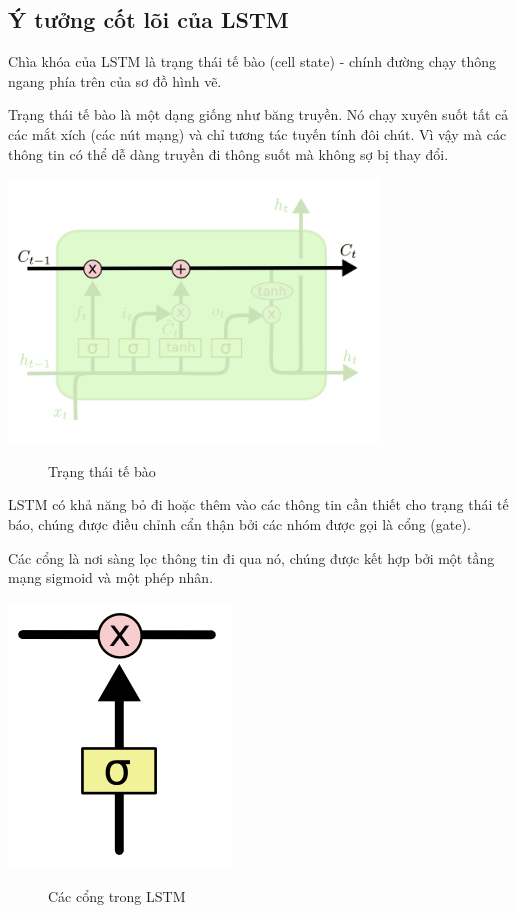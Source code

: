 \subsection{Ý tưởng cốt lõi của LSTM}
Chìa khóa của LSTM là trạng thái tế bào (cell state) - chính đường chạy thông ngang phía trên của sơ đồ hình vẽ.\par
Trạng thái tế bào là một dạng giống như băng truyền. Nó chạy xuyên suốt tất cả các mắt xích (các nút mạng) và chỉ tương tác tuyến tính đôi chút. Vì vậy mà các thông tin có thể dễ dàng truyền đi thông suốt mà không sợ bị thay đổi.
\begin{center}
    \includegraphics[scale=.5]{image/chapter6/yn1.png}
    \begin{figure}[htp]
    \begin{center}
     
    \end{center}
    \caption{Trạng thái tế bào}
    \end{figure}
\end{center}
LSTM có khả năng bỏ đi hoặc thêm vào các thông tin cần thiết cho trạng thái tế báo, chúng được điều chỉnh cẩn thận bởi các nhóm được gọi là cổng (gate).\par
Các cổng là nơi sàng lọc thông tin đi qua nó, chúng được kết hợp bởi một tầng mạng sigmoid và một phép nhân.
\begin{center}
    \includegraphics[scale=.3]{image/chapter6/yn2.png}
    \begin{figure}[htp]
    \begin{center}
     
    \end{center}
    \caption{Các cổng trong LSTM}
    \end{figure}
\end{center}
